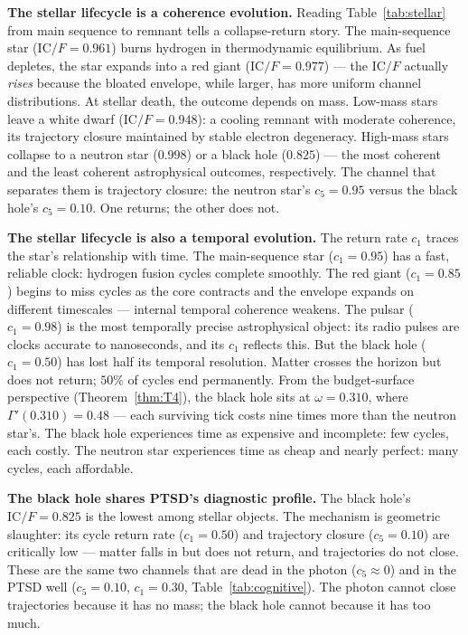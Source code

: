 \documentclass[
  aps,
  prd,
  twocolumn,
  superscriptaddress,
  nofootinbib,
  floatfix
]{revtex4-2}
\newcommand{\Gam}{\Gamma}
\newcommand{\IC}{\mathrm{IC}}
\begin{document}
\textbf{The stellar lifecycle is a coherence evolution.}
Reading Table~\ref{tab:stellar} from main sequence to
remnant tells a collapse-return story.  The main-sequence
star ($\IC/F = 0.961$) burns hydrogen in thermodynamic
equilibrium.  As fuel depletes, the star expands into a
red giant ($\IC/F = 0.977$) --- the $\IC/F$ actually
\emph{rises} because the bloated envelope, while larger,
has more uniform channel distributions.
At stellar death, the outcome depends on mass.  Low-mass
stars leave a white dwarf ($\IC/F = 0.948$): a cooling
remnant with moderate coherence, its trajectory closure
maintained by stable electron degeneracy.  High-mass stars
collapse to a neutron star ($0.998$) or a black hole
($0.825$) --- the most coherent and the least coherent
astrophysical outcomes, respectively.  The channel that
separates them is trajectory closure: the neutron star's
$c_5 = 0.95$ versus the black hole's $c_5 = 0.10$.  One
returns; the other does not.

\textbf{The stellar lifecycle is also a temporal evolution.}
The return rate $c_1$ traces the star's relationship with
time.  The main-sequence star ($c_1 = 0.95$) has a fast,
reliable clock: hydrogen fusion cycles complete smoothly.
The red giant ($c_1 = 0.85$) begins to miss cycles as the
core contracts and the envelope expands on different
timescales --- internal temporal coherence weakens.  The
pulsar ($c_1 = 0.98$) is the most temporally precise
astrophysical object: its radio pulses are clocks accurate
to nanoseconds, and its $c_1$ reflects this.  But the
black hole ($c_1 = 0.50$) has lost half its temporal
resolution.  Matter crosses the horizon but does not
return; $50\%$ of cycles end permanently.  From the
budget-surface perspective (Theorem~\ref{thm:T4}), the
black hole sits at $\omega = 0.310$, where $\Gam'(0.310) =
0.48$ --- each surviving tick costs nine times more than
the neutron star's.  The black hole experiences time as
expensive and incomplete: few cycles, each costly.  The
neutron star experiences time as cheap and nearly perfect:
many cycles, each affordable.

\textbf{The black hole shares PTSD's diagnostic profile.}
The black hole's $\IC/F = 0.825$ is the lowest among stellar
objects.  The mechanism is geometric slaughter: its cycle
return rate ($c_1 = 0.50$) and trajectory closure
($c_5 = 0.10$) are critically low --- matter falls in but
does not return, and trajectories do not close.  These are
the same two channels that are dead in the photon ($c_5
\approx 0$) and in the PTSD well ($c_5 = 0.10$,
$c_1 = 0.30$, Table~\ref{tab:cognitive}).  The photon cannot close trajectories because
it has no mass; the black hole cannot because it has too much.
\end{document}
